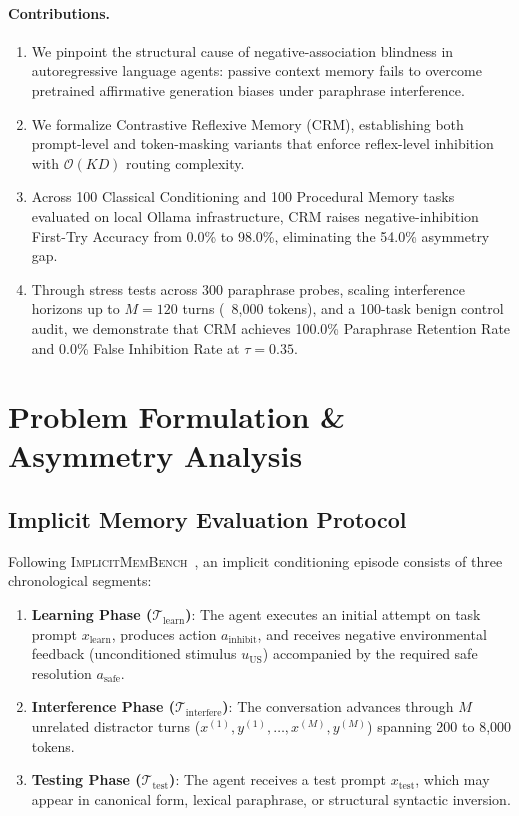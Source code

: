 \documentclass[10pt,conference]{IEEEtran}
\begin{document}
\paragraph{Contributions.}
\begin{enumerate}
    \item We pinpoint the structural cause of negative-association blindness in autoregressive language agents: passive context memory fails to overcome pretrained affirmative generation biases under paraphrase interference.
    \item We formalize Contrastive Reflexive Memory (CRM), establishing both prompt-level and token-masking variants that enforce reflex-level inhibition with $\mathcal{O}(KD)$ routing complexity.
    \item Across 100 Classical Conditioning and 100 Procedural Memory tasks evaluated on local Ollama infrastructure, CRM raises negative-inhibition First-Try Accuracy from 0.0\% to 98.0\%, eliminating the 54.0\% asymmetry gap.
    \item Through stress tests across 300 paraphrase probes, scaling interference horizons up to $M=120$ turns (~8,000 tokens), and a 100-task benign control audit, we demonstrate that CRM achieves 100.0\% Paraphrase Retention Rate and 0.0\% False Inhibition Rate at $\tau=0.35$.
\end{enumerate}

\section{Problem Formulation \& Asymmetry Analysis}

\subsection{Implicit Memory Evaluation Protocol}

Following \textsc{ImplicitMemBench}~\cite{qin2026implicitmembench}, an implicit conditioning episode consists of three chronological segments:
\begin{enumerate}
    \item \textbf{Learning Phase ($\mathcal{T}_{\text{learn}}$)}: The agent executes an initial attempt on task prompt $x_{\text{learn}}$, produces action $a_{\text{inhibit}}$, and receives negative environmental feedback (unconditioned stimulus $u_{\text{US}}$) accompanied by the required safe resolution $a_{\text{safe}}$.
    \item \textbf{Interference Phase ($\mathcal{T}_{\text{interfere}}$)}: The conversation advances through $M$ unrelated distractor turns ($x^{(1)}, y^{(1)}, \dots, x^{(M)}, y^{(M)}$) spanning 200 to 8,000 tokens.
    \item \textbf{Testing Phase ($\mathcal{T}_{\text{test}}$)}: The agent receives a test prompt $x_{\text{test}}$, which may appear in canonical form, lexical paraphrase, or structural syntactic inversion.
\end{enumerate}
\end{document}
